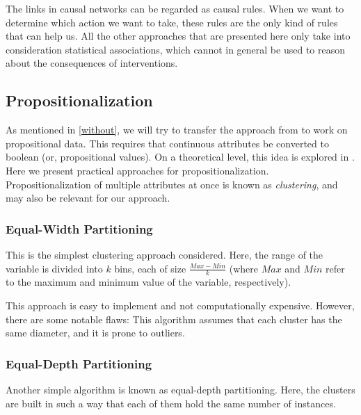 The links in causal networks can be regarded as causal rules. When we want to determine which action we want to take, these rules are the only kind of rules that can help us. All the other approaches that are presented here only take into consideration statistical associations, which cannot in general be used to reason about the consequences of interventions.


\subsection{Propositionalization}

As mentioned in \autoref{without}, we will try to transfer the approach from \citet{verheijProofProbabilities2017} to work on propositional data. This requires that continuous attributes be converted to boolean (or, propositional values). On a theoretical level, this idea is explored in \citet{deraedtLogicalRelationalLearning2008}. Here we present practical approaches for propositionalization. Propositionalization of multiple attributes at once is known as \textit{clustering}, and may also be relevant for our approach.

\subsubsection{Equal-Width Partitioning}

This is the simplest clustering approach considered. Here, the range of the variable is divided into $k$ bins, each of size $\frac{Max-Min}{k}$ (where $Max$ and $Min$ refer to the maximum and minimum value of the variable, respectively).

This approach is easy to implement and not computationally expensive. However, there are some notable flaws: This algorithm assumes that each cluster has the same diameter, and it is prone to outliers.

\subsubsection{Equal-Depth Partitioning}

Another simple algorithm is known as equal-depth partitioning. Here, the clusters are built in such a way that each of them hold the same number of instances.

